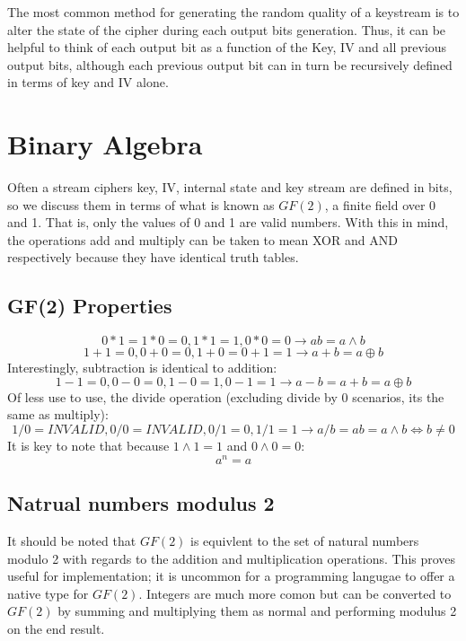 \documentclass{report}
\begin{document}
The most common method for generating the random quality of a keystream is to alter the state of the cipher during each output bits generation. Thus, it can be helpful to think of each output bit as a function of the Key, IV and all previous output bits, although each previous output bit can in turn be recursively defined in terms of key and IV alone.

\section{Binary Algebra}
Often a stream ciphers key, IV, internal state and key stream are defined in bits, so we discuss them in terms of what is known as $\mathit{GF(2)}$, a finite field over 0 and 1. That is, only the values of 0 and 1 are valid numbers. With this in mind, the operations add and multiply can be taken to mean XOR and AND respectively because they have identical truth tables.

\subsection{GF(2) Properties}
\begin{equation} \label{eq:GFtimes}
0*1 = 1*0=0, 1*1=1, 0*0=0 \to ab = a \land b
\end{equation}
\begin{equation} \label{eq:GFadd}
1+1=0, 0+0=0, 1+0=0+1=1 \to a+b = a \oplus b
\end{equation}
Interestingly, subtraction is identical to addition:
\begin{equation} \label{eq:GFminus}
1-1=0, 0-0=0, 1-0=1, 0-1=1 \to a-b = a+b = a \oplus b
\end{equation}
Of less use to use, the divide operation (excluding divide by 0 scenarios, its the same as multiply):
\begin{equation} \label{eq:GFdivide}
1/0=\mathit{INVALID}, 0/0=\mathit{INVALID}, 0/1=0, 1/1=1 \to a/b = ab = a \land b \iff b \neq 0
\end{equation}
It is key to note that because $1\land1=1$ and $0\land0 = 0$:
\begin{equation} \label{eq:GFpowers}
a^n = a
\end{equation}

\subsection{Natrual numbers modulus 2}
It should be noted that $\mathit{GF(2)}$ is equivlent to the set of natural numbers modulo 2 with regards to the addition and multiplication operations. This proves useful for implementation; it is uncommon for a programming langugae to offer a native type for $\mathit{GF(2)}$. Integers are much more comon but can be converted to $\mathit{GF(2)}$ by summing and multiplying them as normal and performing modulus 2 on the end result.
\end{document}
